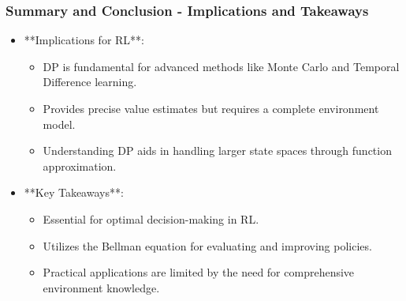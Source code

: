 \documentclass[aspectratio=169]{beamer}
\begin{document}
\begin{frame}[fragile]
  \frametitle{Summary and Conclusion - Implications and Takeaways}
  
  \begin{itemize}
      \item **Implications for RL**:
      \begin{itemize}
          \item DP is fundamental for advanced methods like Monte Carlo and Temporal Difference learning.
          \item Provides precise value estimates but requires a complete environment model.
          \item Understanding DP aids in handling larger state spaces through function approximation.
      \end{itemize}
      \item **Key Takeaways**:
      \begin{itemize}
          \item Essential for optimal decision-making in RL.
          \item Utilizes the Bellman equation for evaluating and improving policies.
          \item Practical applications are limited by the need for comprehensive environment knowledge.
      \end{itemize}
  \end{itemize}
\end{frame}
\end{document}
